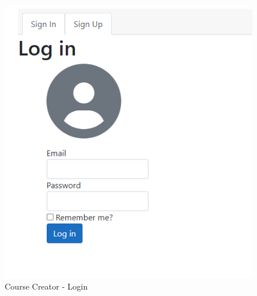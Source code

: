 \begin{figure}[htb]
	\centering
	\includegraphics[width=.6\textwidth]{Requirements/assets/cc-login.png}
	\caption[Course Creator - Login]{\label{Course Creator Login}Course Creator - Login}
\end{figure}

